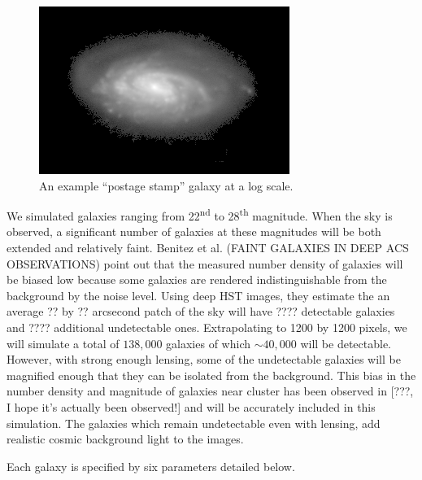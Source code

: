 \documentclass[10pt,twoside]{article}
\theoremstyle{definition}
\theoremstyle{exercise}
\begin{document}
\begin{figure}
  \begin{center}
    \includegraphics[scale=10]{../images/example_galaxy.png}
  \end{center}
  \caption{An example ``postage stamp'' galaxy at a log scale.}
  \label{fig:postage_stamp}
\end{figure}


We simulated galaxies ranging from 22\textsuperscript{nd} to 28\textsuperscript{th} magnitude. When the sky is observed, a significant number of galaxies at these magnitudes will be both extended and relatively faint. Benitez et al. (FAINT GALAXIES IN DEEP ACS OBSERVATIONS) point out that the measured number density of galaxies will be biased low because some galaxies are rendered indistinguishable from the background by the noise level. Using deep HST images, they estimate the an average ?? by ?? arcsecond patch of the sky will have ???? detectable galaxies and ???? additional undetectable ones. Extrapolating to 1200 by 1200 pixels, we will simulate a total of $138,000$ galaxies of which $\sim40,000$ will be detectable. However, with strong enough lensing, some of the undetectable galaxies will be magnified enough that they can be isolated from the background. This bias in the number density and magnitude of galaxies near cluster has been observed in [???, I hope it's actually been observed!] and will be accurately included in this simulation. The galaxies which remain undetectable even with lensing, add realistic cosmic background light to the images.

Each galaxy is specified by six parameters detailed below.
\end{document}
